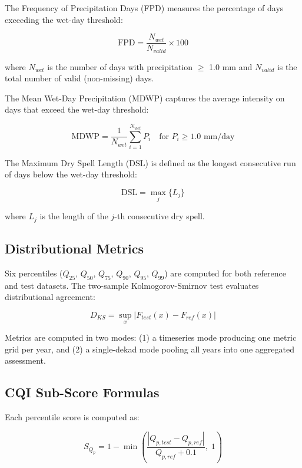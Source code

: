 \documentclass[11pt,a4paper]{article}
\begin{document}
The Frequency of Precipitation Days (FPD) measures the percentage of days exceeding the wet-day threshold:

\begin{equation}\text{FPD} = \frac{N_{wet}}{N_{valid}} \times 100\end{equation}

where $N_{wet}$ is the number of days with precipitation $\geq$ 1.0 mm and $N_{valid}$ is the total number of valid (non-missing) days.

The Mean Wet-Day Precipitation (MDWP) captures the average intensity on days that exceed the wet-day threshold:

\begin{equation}\text{MDWP} = \frac{1}{N_{wet}} \sum_{i=1}^{N_{wet}} P_i \quad \text{for } P_i \geq 1.0 \text{ mm/day}\end{equation}

The Maximum Dry Spell Length (DSL) is defined as the longest consecutive run of days below the wet-day threshold:

\begin{equation}\text{DSL} = \max_{j} \{ L_j \}\end{equation}

where $L_j$ is the length of the $j$-th consecutive dry spell.

\subsection{Distributional Metrics}

Six percentiles ($Q_{25}$, $Q_{50}$, $Q_{75}$, $Q_{90}$, $Q_{95}$, $Q_{99}$) are computed for both reference and test datasets. The two-sample Kolmogorov-Smirnov test evaluates distributional agreement:

\begin{equation}D_{KS} = \sup_{x} |F_{test}(x) - F_{ref}(x)|\end{equation}

Metrics are computed in two modes: (1) a timeseries mode producing one metric grid per year, and (2) a single-dekad mode pooling all years into one aggregated assessment.

\subsection{CQI Sub-Score Formulas}

Each percentile score is computed as:

\begin{equation}S_{Q_p} = 1 - \min\left(\frac{|Q_{p,test} - Q_{p,ref}|}{Q_{p,ref} + 0.1}, \; 1\right)\end{equation}
\end{document}
